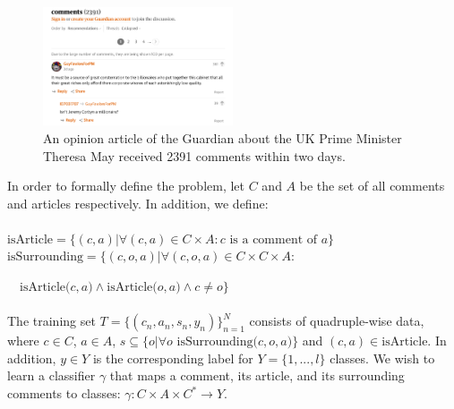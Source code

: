  \begin{figure}
 \vspace*{0.2in}
 \hspace*{-0.1in}
 \includegraphics[width=0.5\textwidth]{comments}
      \caption[Caption for LOF]{An opinion article of the Guardian about the UK Prime Minister Theresa May received 2391 comments within two days.\protect\footnotemark}
    \label{fig:model}
\end{figure}


In order to formally define the problem, let $C$ and $A$ be the set of all comments and articles respectively. In addition, we define: 
\\\\
$\text{isArticle}=\{(c, a)| \forall (c,a) \in C \times A: c\text{ is a comment of }a\}$
\\
$\text{isSurrounding}=\{(c, o, a)| \forall (c,o, a) \in C \times C \times A:$

$\quad\text{isArticle(}c, a\text{)} \wedge \text{isArticle(}o, a\text{)} \wedge  c \neq o\}$
\\\\
The training set $T =\{(c_n, a_n, s_n, y_n)\}^N_{n=1}$ consists of quadruple-wise data, where $c \in C$, $a \in A$, $s \subseteq \{o | \forall o \text{ isSurrounding(}c,o,a)\}$ and $(c, a) \in \text{isArticle}$. In addition, $y \in Y $ is the corresponding label for $Y=\{1,..., l\}$ classes. We wish to learn a classifier $\gamma$ that maps a comment, its article, and its surrounding comments to classes: $\gamma: C \times A \times C^* \rightarrow Y.$



